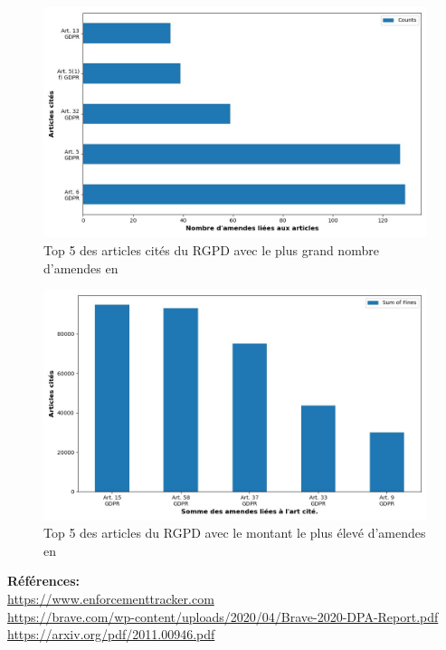 \documentclass[french]{article}
\begin{document}
	\begin{multicols}{2}
	\begin{figure}
		[H]\centering\includegraphics[width=1.0\linewidth]{graphs/top10_quoted_year}
		\caption{Top 5 des articles cités du RGPD avec le plus grand nombre d'amendes en }
	\end{figure}
	\begin{figure}
		[H]\centering\includegraphics[width=1\linewidth]{graphs/top10_quoted_year_fines}
		\caption{Top 5 des articles  du RGPD avec le montant le plus élevé d'amendes en }
	 \end{figure}
	
	\end{multicols}









\vspace*{\fill}
\textbf{Références:}\\
\href{https://www.enforcementtracker.com}{https://www.enforcementtracker.com}\\
\href{https://brave.com/wp-content/uploads/2020/04/Brave-2020-DPA-Report.pdf}{https://brave.com/wp-content/uploads/2020/04/Brave-2020-DPA-Report.pdf}\\
\href{https://arxiv.org/pdf/2011.00946.pdf}{https://arxiv.org/pdf/2011.00946.pdf}
\end{document}
